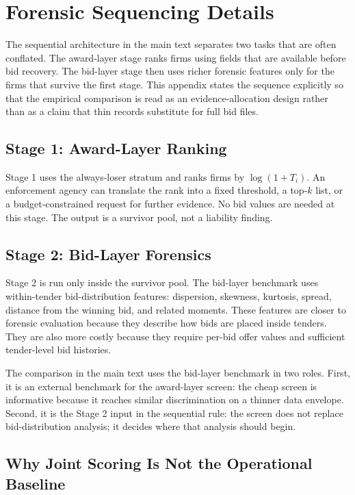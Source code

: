\section{Forensic Sequencing Details}
\label{app:forensic_sequence_submission}

The sequential architecture in the main text separates two tasks
that are often conflated. The award-layer stage ranks firms using
fields that are available before bid recovery. The bid-layer
stage then uses richer forensic features only for the firms that
survive the first stage. This appendix states the sequence
explicitly so that the empirical comparison is read as an
evidence-allocation design rather than as a claim that thin
records substitute for full bid files.

\subsection{Stage 1: Award-Layer Ranking}
\label{app:stage1_submission}

Stage 1 uses the always-loser stratum and ranks firms by
$\log(1+T_i)$. An enforcement agency can translate the rank into
a fixed threshold, a top-$k$ list, or a budget-constrained request
for further evidence. No bid values are needed at this stage.
The output is a survivor pool, not a liability finding.

\subsection{Stage 2: Bid-Layer Forensics}
\label{app:stage2_submission}

Stage 2 is run only inside the survivor pool. The bid-layer
benchmark uses within-tender bid-distribution features:
dispersion, skewness, kurtosis, spread, distance from the winning
bid, and related moments. These features are closer to forensic
evaluation because they describe how bids are placed inside tenders.
They are also more costly because they require per-bid offer
values and sufficient tender-level bid histories.

The comparison in the main text uses the bid-layer benchmark in
two roles. First, it is an external benchmark for the award-layer
screen: the cheap screen is informative because it reaches
similar discrimination on a thinner data envelope. Second, it is
the Stage 2 input in the sequential rule: the screen does not
replace bid-distribution analysis; it decides where that analysis
should begin.

\subsection{Why Joint Scoring Is Not the Operational Baseline}
\label{app:joint_scoring_submission}

